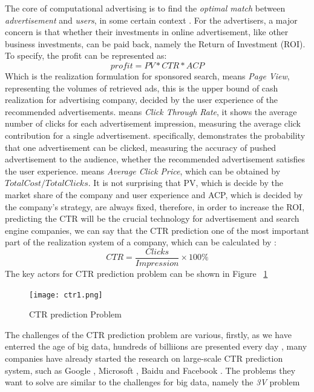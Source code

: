 The core of computational advertising is to find the \textit{optimal match} between \textit{advertisement} and \textit{users}, in some certain context \cite{balakrishnan2014real}. For the advertisers, a major concern is that whether their investments in online advertisement, like other business investments, can be paid back, namely the Return of Investment (ROI). To specify, the profit can be represented as:\
\begin{equation}
profit = PV * CTR * ACP
\end{equation}
Which is the realization formulation for sponsored search, \PV means \textit{Page View}, representing the volumes of retrieved ads, this is the upper bound of cash realization for advertising company, decided by the user experience of the recommended advertisements. \CTR means \textit{Click Through Rate}, it shows the average number of clicks for each advertisement impression, measuring the average click contribution for a single advertisement. specifically, \CTR demonstrates the probability that one advertisement can be clicked, measuring the accuracy of pushed advertisement to the audience, whether the recommended advertisement satisfies the user experience. \ACP means \textit{Average Click Price}, which can be obtained by \(Total Cost / Total Clicks\). It is not surprising that PV, which is decide by the market share of the company and user experience and ACP, which is decided by the company's strategy, are always fixed, therefore, in order to increase the ROI, predicting the CTR will be the crucial technology for advertisement and search engine companies, we can say that the CTR prediction one of the most important part of the realization system of a company, which can be calculated by :
\begin{equation}
CTR = \frac{Clicks}{Impression} \times 100\%
\end{equation}
The key actors for CTR prediction problem can be shown in Figure ~\ref{fig:ctr}
\begin{figure}[h]
\centering
\texttt{[image: ctr1.png]}
\caption{CTR prediction Problem}
\label{fig:ctr}
\end{figure}
The challenges of the CTR prediction problem are various, firstly, as we have enterred the age of big data, hundreds of billiions are presented every day \cite{lohr2012age}, many companies have already started the research on large-scale CTR prediction system, such as Google \cite{mcmahan2013ad}, Microsoft \cite{graepel2010web}, Baidu \cite{liu2012enlister} and Facebook \cite{he2014practical}. The problems they want to solve are similar to the challenges for big data, namely the \textit{3V} problem
